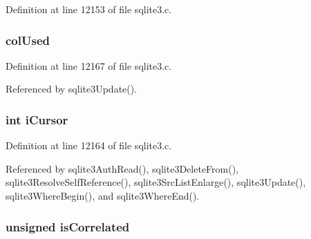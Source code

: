Definition at line 12153 of file sqlite3.\+c.

\hypertarget{struct_src_list_1_1_src_list__item_afa02135ab8d4146d04a435b9805ceeab}{}
\subsubsection[{col\+Used}]{ col\+Used}\label{struct_src_list_1_1_src_list__item_afa02135ab8d4146d04a435b9805ceeab}


Definition at line 12167 of file sqlite3.\+c.



Referenced by sqlite3\+Update().

\hypertarget{struct_src_list_1_1_src_list__item_af55c682e0c77506f24068e2adde30514}{}
\subsubsection[{i\+Cursor}]{\setlength{\rightskip}{0pt plus 5cm}int i\+Cursor}\label{struct_src_list_1_1_src_list__item_af55c682e0c77506f24068e2adde30514}


Definition at line 12164 of file sqlite3.\+c.



Referenced by sqlite3\+Auth\+Read(), sqlite3\+Delete\+From(), sqlite3\+Resolve\+Self\+Reference(), sqlite3\+Src\+List\+Enlarge(), sqlite3\+Update(), sqlite3\+Where\+Begin(), and sqlite3\+Where\+End().

\hypertarget{struct_src_list_1_1_src_list__item_aa4f7751c77c8ec69870a70999fb2dcde}{}
\subsubsection[{is\+Correlated}]{\setlength{\rightskip}{0pt plus 5cm}unsigned is\+Correlated}\label{struct_src_list_1_1_src_list__item_aa4f7751c77c8ec69870a70999fb2dcde}


